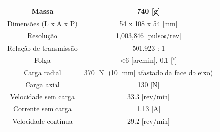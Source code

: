 \documentclass[
12pt,					%
openright,				%
twoside,				%
a4paper,				%
english,
brazil
]{ABNT/abntex2_report}
\begin{document}
\begin{table}[H]
\begin{adjustbox}{max width=\textwidth}
\begin{tabular}{|c|c|}
			\rowcolor[HTML]{FFFFFF} 
			{\color[HTML]{000000} Massa}                                                       & {\color[HTML]{000000} 740 {[}g{]}}                                                              \\ \hline
			\rowcolor[HTML]{EFEFEF} 
			{\color[HTML]{000000} Dimensões (L x A x P)}                                       & {\color[HTML]{000000} 54 x 108 x 54 {[}mm{]}}                                                   \\ \hline
			\rowcolor[HTML]{FFFFFF} 
			{\color[HTML]{000000} Resolução}                                                   & {\color[HTML]{000000} 1,003,846 {[}pulsos/rev{]}}                                               \\ \hline
			\rowcolor[HTML]{EFEFEF} 
			{\color[HTML]{000000} Relação de transmissão}                                      & {\color[HTML]{000000} 501.923 : 1}                                                              \\ \hline
			\rowcolor[HTML]{FFFFFF} 
			{\color[HTML]{000000} Folga}                                                       & {\color[HTML]{000000} \textless 6 {[}arcmin{]}, 0.1 {[}$^\circ${]}}                             \\ \hline
			\rowcolor[HTML]{EFEFEF} 
			{\color[HTML]{000000} Carga radial}                                                & {\color[HTML]{000000} 370 {[}N{]} (10 {[}mm{]} afastado da face do eixo)}                       \\ \hline
			\rowcolor[HTML]{FFFFFF} 
			{\color[HTML]{000000} Carga axial}                                                 & {\color[HTML]{000000} 130 {[}N{]}}                                                              \\ \hline
			\rowcolor[HTML]{EFEFEF} 
			{\color[HTML]{000000} Velocidade sem carga}                                        & {\color[HTML]{000000} 33.3 {[}rev/min{]}}                                                       \\ \hline
			\rowcolor[HTML]{FFFFFF} 
			{\color[HTML]{000000} Corrente sem carga}                                          & {\color[HTML]{000000} 1.13 {[}A{]}}                                                             \\ \hline
			\rowcolor[HTML]{EFEFEF} 
			{\color[HTML]{000000} Velocidade contínua}                                         & {\color[HTML]{000000} 29.2 {[}rev/min{]}}                                                       \\ \hline

\end{tabular}
\end{adjustbox}
\end{table}
\end{document}
